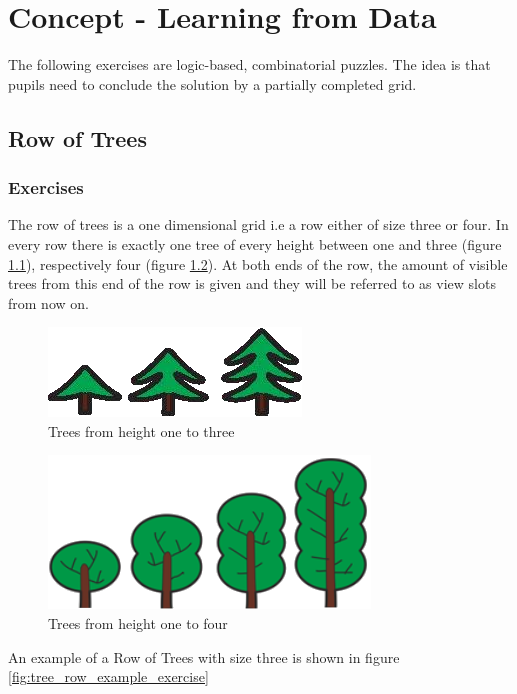 \chapter{Concept - Learning from Data}
\label{chapter:learningFromData}

The following exercises are logic-based, combinatorial puzzles. The idea is that pupils need to conclude the solution by a partially completed grid.

\section{Row of Trees}
\label{section:treeRow}

\subsection{Exercises}
The row of trees is a one dimensional grid i.e a row either of size three or four. In every row there is exactly one tree of every height between one and three (figure \ref{fig:trees_3}), respectively four (figure \ref{fig:trees_4}). At both ends of the row, the amount of visible trees from this end of the row is given and they will be referred to as view slots from now on.

\begin{figure} 
    \centering
    \includegraphics[width=0.4 \columnwidth]{figures/trees_3.png}
    \caption{Trees from height one to three} 
    \label{fig:trees_3} 
\end{figure}

\begin{figure} 
    \centering
    \includegraphics[width=0.4 \columnwidth]{figures/trees_4.png}
    \caption{Trees from height one to four} 
    \label{fig:trees_4} 
\end{figure}

\begin{example}
    An example of a Row of Trees with size three is shown in figure \ref{fig:tree_row_example_exercise}
\end{example}

